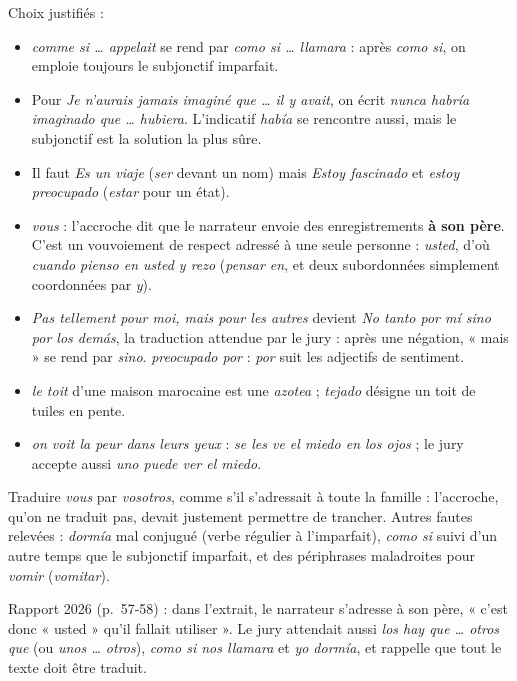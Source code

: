 \documentclass[11pt,a4paper]{article}
\providecommand{\tightlist}{\setlength{\itemsep}{0pt}\setlength{\parskip}{0pt}}
\begin{document}
Choix justifiés :

\begin{itemize}
\tightlist
\item
  \emph{comme si \ldots{} appelait} se rend par \emph{como si \ldots{} llamara} : après \emph{como si}, on emploie toujours le subjonctif imparfait.
\item
  Pour \emph{Je n'aurais jamais imaginé que \ldots{} il y avait}, on écrit \emph{nunca habría imaginado que \ldots{} hubiera}. L'indicatif \emph{había} se rencontre aussi, mais le subjonctif est la solution la plus sûre.
\item
  Il faut \emph{Es un viaje} (\emph{ser} devant un nom) mais \emph{Estoy fascinado} et \emph{estoy preocupado} (\emph{estar} pour un état).
\item
  \emph{vous} : l'accroche dit que le narrateur envoie des enregistrements \textbf{à son père}. C'est un vouvoiement de respect adressé à une seule personne : \emph{usted}, d'où \emph{cuando pienso en usted y rezo} (\emph{pensar en}, et deux subordonnées simplement coordonnées par \emph{y}).
\item
  \emph{Pas tellement pour moi, mais pour les autres} devient \emph{No tanto por mí sino por los demás}, la traduction attendue par le jury : après une négation, « mais » se rend par \emph{sino}. \emph{preocupado por} : \emph{por} suit les adjectifs de sentiment.
\item
  \emph{le toit} d'une maison marocaine est une \emph{azotea} ; \emph{tejado} désigne un toit de tuiles en pente.
\item
  \emph{on voit la peur dans leurs yeux} : \emph{se les ve el miedo en los ojos} ; le jury accepte aussi \emph{uno puede ver el miedo}.
\end{itemize}

\begin{piege}

Traduire \emph{vous} par \emph{vosotros}, comme s'il s'adressait à toute la famille : l'accroche, qu'on ne traduit pas, devait justement permettre de trancher. Autres fautes relevées : \emph{dormía} mal conjugué (verbe régulier à l'imparfait), \emph{como si} suivi d'un autre temps que le subjonctif imparfait, et des périphrases maladroites pour \emph{vomir} (\emph{vomitar}).

\end{piege}

\begin{jury}

Rapport 2026 (p.~57-58) : dans l'extrait, le narrateur s'adresse à son père, « c'est donc « usted » qu'il fallait utiliser ». Le jury attendait aussi \emph{los hay que \ldots{} otros que} (ou \emph{unos \ldots{} otros}), \emph{como si nos llamara} et \emph{yo dormía}, et rappelle que tout le texte doit être traduit.

\end{jury}
\end{document}
